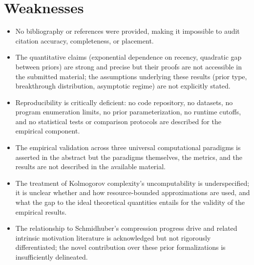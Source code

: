 \documentclass[11pt]{article}
\begin{document}
\section*{Weaknesses}
\begin{itemize}[leftmargin=*]
  \item No bibliography or references were provided, making it impossible to audit citation accuracy, completeness, or placement.
  \item The quantitative claims (exponential dependence on recency, quadratic gap between priors) are strong and precise but their proofs are not accessible in the submitted material; the assumptions underlying these results (prior type, breakthrough distribution, asymptotic regime) are not explicitly stated.
  \item Reproducibility is critically deficient: no code repository, no datasets, no program enumeration limits, no prior parameterization, no runtime cutoffs, and no statistical tests or comparison protocols are described for the empirical component.
  \item The empirical validation across three universal computational paradigms is asserted in the abstract but the paradigms themselves, the metrics, and the results are not described in the available material.
  \item The treatment of Kolmogorov complexity's uncomputability is underspecified; it is unclear whether and how resource-bounded approximations are used, and what the gap to the ideal theoretical quantities entails for the validity of the empirical results.
  \item The relationship to Schmidhuber's compression progress drive and related intrinsic motivation literature is acknowledged but not rigorously differentiated; the novel contribution over these prior formalizations is insufficiently delineated.
\end{itemize}
\end{document}
